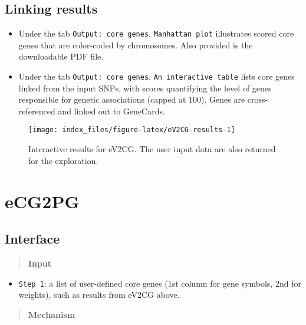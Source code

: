 \documentclass[
  oneside]{book}
\providecommand{\tightlist}{%
  \setlength{\itemsep}{0pt}\setlength{\parskip}{0pt}}
\begin{document}
\hypertarget{linking-results}{%
\section{Linking results}\label{linking-results}}

\begin{itemize}
\item
  Under the tab \texttt{Output:\ core\ genes}, \texttt{Manhattan\ plot} illustrates scored core genes that are color-coded by chromosomes. Also provided is the downloadable PDF file.
\item
  Under the tab \texttt{Output:\ core\ genes}, \texttt{An\ interactive\ table} lists core genes linked from the input SNPs, with scores quantifying the level of genes responsible for genetic associations (capped at 100). Genes are cross-referenced and linked out to GeneCards.
\end{itemize}

\begin{figure}

{\centering \texttt{[image: index\_files/figure-latex/eV2CG-results-1]} 

}

\caption{Interactive results for eV2CG. The user input data are also returned for the exploration.}\label{fig:eV2CG-results}
\end{figure}

\hypertarget{ecg2pg}{%
\chapter{eCG2PG}\label{ecg2pg}}

\hypertarget{interface-1}{%
\section{Interface}\label{interface-1}}

\begin{quote}
\textbf{Input}
\end{quote}

\begin{itemize}
\tightlist
\item
  \texttt{Step\ 1}: a list of user-defined core genes (1st column for gene symbols, 2nd for weights), such as results from eV2CG above.
\end{itemize}

\begin{quote}
\textbf{Mechanism}
\end{quote}
\end{document}
